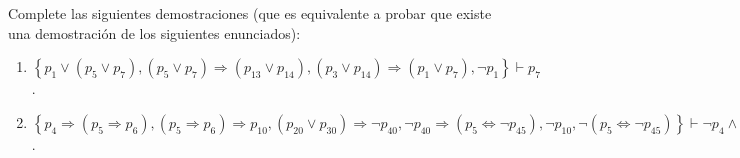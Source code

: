 \documentclass[12pt]{report}
\theoremstyle{largebreak}
\begin{document}
    \begin{excer}
        Complete las siguientes demostraciones (que es equivalente a probar que existe una demostración de los siguientes enunciados):
        \begin{enumerate}
            \item $\left\{p_1\lor(p_5\lor p_7),(p_5\lor p_7)\Rightarrow(p_{13}\lor p_{14}),(p_3\lor p_{14})\Rightarrow(p_1\lor p_7),\neg p_1 \right\}\vdash p_7$.
            \item $\left\{p_4\Rightarrow(p_5\Rightarrow p_6),(p_5\Rightarrow p_6)\Rightarrow p_{10},(p_{20}\lor p_{ 30})\Rightarrow \neg p_{ 40}, \neg p_{ 40}\Rightarrow( p_5\iff \neg p_{ 45}),\neg p_{10},\neg(p_5\iff\neg p_{45}) \right\}\vdash \neg p_4\land(p_{20}\lor p_{30})$.
        \end{enumerate}
    \end{excer}
\end{document}
